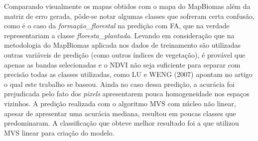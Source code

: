 Comparando visualmente os mapas obtidos com o mapa do MapBiomas além da matriz de erro gerada, pôde-se notar algumas classes que sofreram certa confusão, como é o caso da \emph{formação\_florestal} na predição com FA, que na verdade representariam a classe \emph{floresta\_plantada}. Levando em consideração que na  metodologia do MapBiomas aplicada nos dados de
treinamento são utilizadas outras variáveis de predição (como outros
índices de vegetação), é provável que apenas as bandas selecionadas e o
NDVI não seja suficiente para separar com precisão todas as classes
utilizadas, como LU e WENG (2007) apontam no artigo o qual este trabalho se
baseou. Ainda no caso dessa predição, a acurácia foi prejudicada pelo
fato dos \emph{pixels} apresentarem pouca homogeneidade nos espaços
vizinhos. A predição realizada com o algoritmo MVS com núcleo não
linear, apesar de apresentar uma acurácia mediana, resultou em poucas
classes que predominaram. A classificação que obteve melhor resultado
foi a que utilizou MVS linear para criação do modelo.
